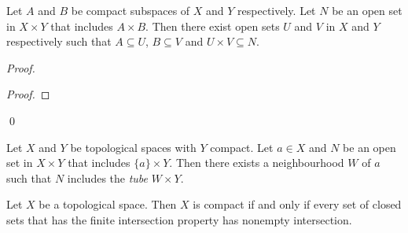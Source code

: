 \begin{theorem}
    \label{theorem:generalized_tube_lemma}
    Let $A$ and $B$ be compact subspaces of $X$ and $Y$ respectively. Let $N$ be an open set in $X \times Y$ that includes $A \times B$.
    Then there exist open sets $U$ and $V$ in $X$ and $Y$ respectively such that $A \subseteq U$, $B \subseteq V$ and $U \times V \subseteq N$.
\end{theorem}

\begin{proof}
    \pf
    \begin{proof}
    \end{proof}
    \qed
\end{proof}

\begin{corollary}
    Let $X$ and $Y$ be topological spaces with $Y$ compact. Let $a \in X$
    and $N$ be an open set in $X \times Y$ that includes $\{a\} \times Y$.
    Then there exists a neighbourhood $W$ of $a$ such that
    $N$ includes the \emph{tube} $W \times Y$.
\end{corollary}

\begin{theorem}
    \label{theorem:compact_closed_sets}
    Let $X$ be a topological space. Then $X$ is compact if and only if every set of closed sets that has the finite intersection property has nonempty intersection.
\end{theorem}

